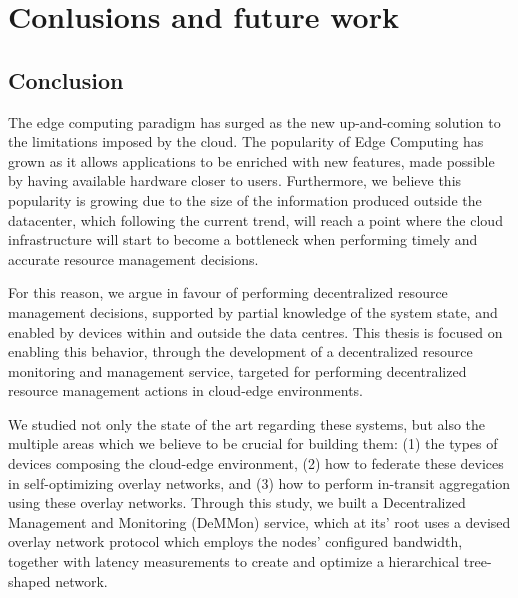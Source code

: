 

\chapter{Conlusions and future work} \label{cha:conclusions_future_work}

\section{Conclusion}

The edge computing paradigm has surged as the new up-and-coming solution to the limitations imposed by the cloud. The popularity of Edge Computing has grown as it allows applications to be enriched with new features, made possible by having available hardware closer to users. Furthermore, we believe this popularity is growing due to the size of the information produced outside the datacenter, which following the current trend, will reach a point where the cloud infrastructure will start to become a bottleneck when performing timely and accurate resource management decisions. 

For this reason, we argue in favour of performing decentralized resource management decisions, supported by partial knowledge of the system state, and enabled by devices within and outside the data centres. This thesis is focused on enabling this behavior, through the development of a decentralized resource monitoring and management service, targeted for performing decentralized resource management actions in cloud-edge environments.

We studied not only the state of the art regarding these systems, but also the multiple areas which we believe to be crucial for building them: (1) the types of devices composing the cloud-edge environment, (2) how to federate these devices in self-optimizing overlay networks, and (3) how to perform in-transit aggregation using these overlay networks. Through this study, we built a Decentralized Management and Monitoring (DeMMon) service, which at its’ root uses a devised overlay network protocol which employs the nodes' configured bandwidth, together with latency measurements to create and optimize a hierarchical tree-shaped network.

